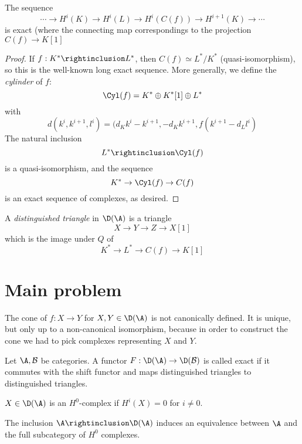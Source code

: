\documentclass[etingof-dmod.tex]{subfiles}
\begin{document}
  \begin{lem}
    The sequence $$\cdots \rightarrow H^i(K) \rightarrow H^i(L) \rightarrow
    H^i(C(f)) \rightarrow H^{i+1}(K) \rightarrow \cdots$$ is exact (where the
      connecting map correspondings to the projection $C(f) \rightarrow K[1]$
  \end{lem}
  \begin{proof}
    If $f: K^* \rightinclusion L^*$, then $C(f) \simeq L^* / {K^*}$
    (quasi-isomorphism), so this is the well-known long exact sequence. More
    generally, we define the \textit{cylinder} of $f$: $$\Cyl(f) = K^* \oplus
    K^*[1] \oplus L^*$$ with $$d(k^i, k^{i+1}, l^i) = (d_K k^i - k^{i+1},
      -d_Kk^{i+1}, f(k^{i+1} - d_L l^i)$$
      The natural inclusion $$L^* \rightinclusion \Cyl(f)$$ is a
      quasi-isomorphism, and the sequence $$K^* \rightarrow \Cyl(f) \rightarrow
      C(f)$$ is an exact sequence of complexes, as desired.
  \end{proof}

  \begin{defn}
    A \textit{distinguished triangle} in $\D(\A)$ is a triangle $$X \rightarrow
    Y \rightarrow Z \rightarrow X[1]$$ which is the image under $Q$ of
    $$K^* \rightarrow L^* \rightarrow C(f) \rightarrow K[1]$$
  \end{defn}

\section{Main problem}

The cone of $f: X \rightarrow Y$ for $X,Y \in \D(\A)$ is not canonically
defined. It is unique, but only up to a non-canonical isomorphism, because in
order to construct the cone we had to pick complexes representing $X$ and $Y$.

\begin{defn}
  Let $\A, \mc{B}$ be categories. A functor $F: \D(\A) \rightarrow \D(\mc{B})$ is
    called exact if it commutes with the shift functor and maps distinguished
    triangles to distinguished triangles.
\end{defn}

\begin{defn}
  $X \in \D(\A)$ is an $H^0$-complex if $H^i(X) = 0$ for $i \neq 0$.
\end{defn}

\begin{lem}
  The inclusion $\A \rightinclusion \D(\A)$ induces an equivalence between $\A$
  and the full subcategory of $H^0$ complexes.
\end{lem}
\end{document}
